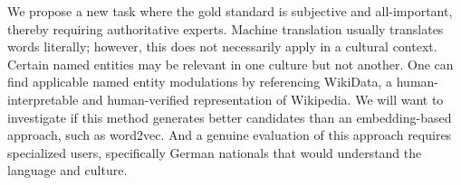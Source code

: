 \label{ch:proposal}

%

We propose a new task where the gold standard is subjective and all-important, thereby requiring authoritative experts.  
%
Machine translation usually translates words literally; however, this does not necessarily apply in a cultural context.  
%
Certain named entities may be relevant in one culture but not another.  
%
One can find applicable named entity modulations by referencing WikiData, a human-interpretable and human-verified representation of Wikipedia.
%
We will want to investigate if this method generates better candidates than an embedding-based approach, such as word2vec.  
%
And a genuine evaluation of this approach requires specialized users, specifically German nationals that would understand the language and culture.  
